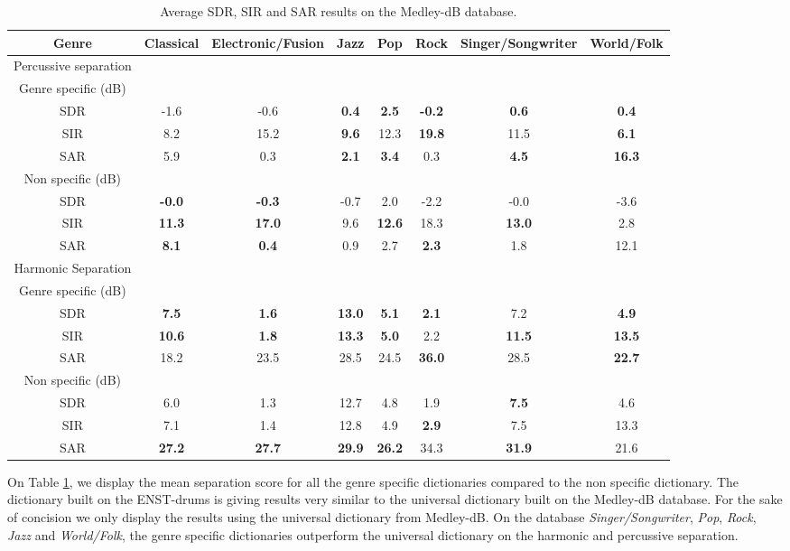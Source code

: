 \documentclass{article}
\begin{document}
\begin{table}
   
\begin{tabular}{|c|c|c|c|c|c|c|c|}
\hline   
Genre & Classical & Electronic/Fusion & Jazz & Pop & Rock & Singer/Songwriter & World/Folk \\
\hline
Percussive separation & & & & & & & \\
\hline
Genre specific (dB)  & & & & & & & \\
SDR & -1.6     & -0.6     &\bf{0.4} & \bf{2.5}&\bf{-0.2}& \bf{0.6} & \bf{0.4} \\
SIR & 8.2      & 15.2     &\bf{9.6} & 12.3    &\bf{19.8}& 11.5     & \bf{6.1} \\
SAR & 5.9      & 0.3      &\bf{2.1} & \bf{3.4}& 0.3    & \bf{4.5} & \bf{16.3} \\
\hline
Non specific (dB) & & & & & & &\\
SDR & \bf{-0.0}& \bf{-0.3}& -0.7    & 2.0     & -2.2    & -0.0     & -3.6 \\
SIR & \bf{11.3} & \bf{17.0}& 9.6     &\bf{12.6}& 18.3    & \bf{13.0}& 2.8 \\
SAR & \bf{8.1} & \bf{0.4} & 0.9     & 2.7     &\bf{2.3} & 1.8      & 12.1 \\
\hline   
Harmonic Separation &  & & & & & & \\  
\hline
Genre specific (dB)  & & & & & & & \\
SDR & \bf{7.5}    & \bf{1.6}    & \bf{13.0} & \bf{5.1}  & \bf{2.1}& 7.2      &\bf{4.9} \\
SIR & \bf{10.6}   & \bf{1.8}    & \bf{13.3} & \bf{5.0 } & 2.2     & \bf{11.5}& \bf{13.5} \\
SAR & 18.2       & 23.5       & 28.5      & 24.5      &\bf{36.0}& 28.5     & \bf{22.7} \\
\hline
Non specific (dB) & & & & & & &\\
SDR & 6.0        & 1.3       & 12.7     & 4.8      & 1.9      & \bf{7.5}      & 4.6\\
SIR & 7.1       & 1.4        & 12.8     & 4.9      & \bf{2.9} & 7.5      & 13.3 \\
SAR & \bf{27.2}& \bf{27.7}   & \bf{29.9} & \bf{26.2}& 34.3     &\bf{31.9} & 21.6\\
\hline
  \end{tabular} 
\caption{\label{specresults} Average SDR, SIR and SAR results on the Medley-dB database.}
\end{table}



On Table \ref{specresults}, we display the mean separation score for all the genre specific dictionaries compared to the non specific dictionary. The dictionary built on the ENST-drums is giving results very similar to the universal dictionary built on the Medley-dB database. For the sake of concision we only display the results using the universal dictionary from Medley-dB. On the database \emph{Singer/Songwriter}, \emph{Pop}, \emph{Rock}, \emph{Jazz} and \emph{World/Folk}, the genre specific dictionaries outperform the universal dictionary on the harmonic and percussive separation.
\vspace{-0.5cm}
\end{document}
